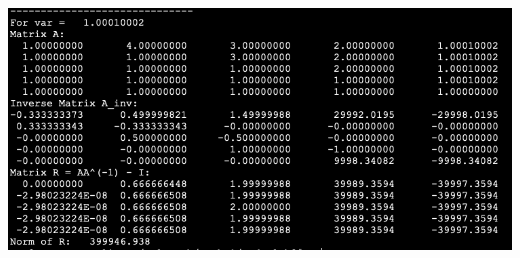 \documentclass[a4paper,14pt]{article}
\begin{document}
\includegraphics[width=170mm]{var_1_0001.png}
\end{document}
